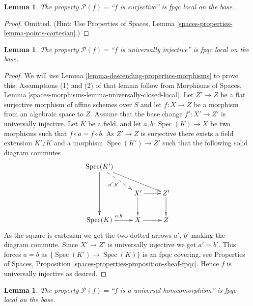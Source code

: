 \documentclass{stacks-project}
\theoremstyle{plain}
\newtheorem{lemma}[subsection]{Lemma}
\theoremstyle{definition}
\theoremstyle{remark}
\numberwithin{equation}{subsection}
\def\Spec{\mathop{\mathrm{Spec}}}
\begin{document}
\begin{lemma}
\label{lemma-descending-property-surjective}
The property $\mathcal{P}(f) =$``$f$ is surjective''
is fpqc local on the base.
\end{lemma}

\begin{proof}
Omitted. (Hint: Use
Properties of Spaces, Lemma \ref{spaces-properties-lemma-points-cartesian}.)
\end{proof}

\begin{lemma}
\label{lemma-descending-property-universally-injective}
The property $\mathcal{P}(f) =$``$f$ is universally injective''
is fpqc local on the base.
\end{lemma}

\begin{proof}
We will use
Lemma \ref{lemma-descending-properties-morphisms}
to prove this. Assumptions (1) and (2) of that lemma follow from
Morphisms of Spaces,
Lemma \ref{spaces-morphisms-lemma-universally-closed-local}.
Let $Z' \to Z$ be a flat surjective morphism of affine schemes
over $S$ and let $f : X \to Z$ be a morphism from an algebraic space to $Z$.
Assume that the base change $f' : X' \to Z'$ is universally injective.
Let $K$ be a field, and let $a, b : \Spec(K) \to X$
be two morphisms such that $f \circ a = f \circ b$.
As $Z' \to Z$ is surjective there exists a field
extension $K'/K$ and a morphism
$\Spec(K') \to Z'$
such that the following solid diagram commutes
$$
\xymatrix{
\Spec(K') \ar[rrd] \ar@{-->}[rd]_{a', b'} \ar[dd] \\
 &
X' \ar[r] \ar[d] &
Z' \ar[d] \\
\Spec(K) \ar[r]^{a, b} &
X \ar[r] &
Z
}
$$
As the square is cartesian we get the two dotted arrows $a'$, $b'$ making the
diagram commute. Since $X' \to Z'$ is universally injective we get $a' = b'$.
This forces $a = b$ as $\{\Spec(K') \to \Spec(K)\}$
is an fpqc covering, see
Properties of Spaces, Proposition
\ref{spaces-properties-proposition-sheaf-fpqc}.
Hence $f$ is universally injective as desired.
\end{proof}

\begin{lemma}
\label{lemma-descending-property-universal-homeomorphism}
The property $\mathcal{P}(f) =$``$f$ is a universal homeomorphism''
is fpqc local on the base.
\end{lemma}
\end{document}
